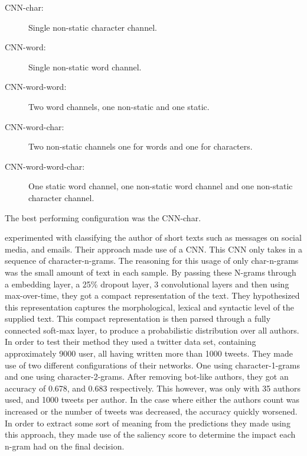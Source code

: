 \begin{description}
    \item[CNN-char:] Single non-static character channel.
    \item[CNN-word:] Single non-static word channel.
    \item[CNN-word-word:] Two word channels, one non-static and one static.
    \item[CNN-word-char:] Two non-static channels one for words and one for
        characters.
    \item[CNN-word-word-char:] One static word channel, one non-static word
        channel and one non-static character channel.
\end{description}

The best performing configuration was the CNN-char.

\cite{shrestha2017} experimented with classifying the author of short texts
such as messages on social media, and emails. Their approach made use of a
\gls{CNN}. This \gls{CNN} only takes in a sequence of character-n-grams. The
reasoning for this usage of only char-n-grams was the small amount of text
in each sample. By passing these N-grams through a embedding layer, a 25\%
dropout layer, 3 convolutional layers and then using max-over-time, they got
a compact representation of the text. They hypothesized this representation
captures the morphological, lexical and syntactic level of the supplied text.
This compact representation is then parsed through a fully connected soft-max
layer, to produce a probabilistic distribution over all authors. In order to
test their method they used a twitter data set, containing approximately 9000
user, all having written more than 1000 tweets. They made use of two different
configurations of their networks. One using character-1-grams and one using
character-2-grams. After removing bot-like authors, they got an accuracy of
0.678, and 0.683 respectively. This however, was only with 35 authors used,
and 1000 tweets per author. In the case where either the authors count was
increased or the number of tweets was decreased, the accuracy quickly worsened.
In order to extract some sort of meaning from the predictions they made using
this approach, they made use of the saliency score to determine the impact each
n-gram had on the final decision.

